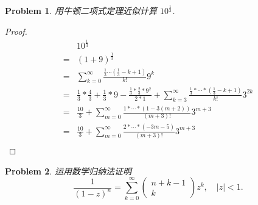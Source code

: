 \documentclass{ctexart}
\newtheorem{problem}{\textbf{Problem}}
\renewcommand{\(}{\left(}
\renewcommand{\)}{\right)}
\begin{document}
\begin{problem}
用牛顿二项式定理近似计算 $10^{\frac{1}{3}}$.
\end{problem}
\begin{proof}
\begin{equation}
    \begin{aligned}
        &10^{\frac{1}{3}}\\
    =&(1+9)^{\frac{1}{3}}\\
    =&\sum_{k=0}^{\infty}\frac{\frac{1}{3}\cdots(\frac{1}{3}-k+1)}{k!}9^k\\
    =&\frac{1}{3}*\frac{4}{3}+\frac{1}{3}*9-\frac{\frac{1}{3}*\frac{2}{3}*9^2}{2*1}+\sum_{k=3}^{\infty}\frac{\frac{1}{3}*\cdots *(\frac{1}{3}-k+1)}{k!}3^{2k}\\
    =&\frac{10}{3}+\sum_{m=0}^{\infty}\frac{1*\cdots *(1-3(m+2))}{(m+3)!}3^{m+3}\\
    =&\frac{10}{3}+\sum_{m=0}^{\infty}\frac{2*\cdots *(-3m-5)}{(m+3)!}3^{m+3}\\\iffalse    
    =&\frac{10}{3}+\sum_{t=0}^{\infty}\frac{1*\cdots *(1-3(2t+2))}{(2t+3)!}3^{2t+3}+\sum_{t=0}^{\infty}\frac{1*\cdots *(1-3(2t+3))}{(2t+4)!}3^{2t+4}\\
    =&\frac{10}{3}+\sum_{t=0}^{\infty}\(\frac{1*\cdots *(1-3(2t+2))}{(2t+3)!}3^{2t+3}+\frac{1*\cdots *(1-3(2t+3))}{(2t+4)!}3^{2t+4}\)\\
    =&\frac{10}{3}+\sum_{t=0}^{\infty}\(\frac{2*\cdots *(6t+5)}{(2t+3)!}3^{2t+3}-\frac{2*\cdots *(6t+8)}{(2t+4)!}3^{2t+4}\)\\
    =&\frac{10}{3}+\sum_{t=0}^{\infty}\frac{2*\cdots *(6t+5)}{(2t+3)!}\(1-\frac{6t+8}{2t+4}*3 \)3^{2t+3}\\
    =& \frac{10}{3}-\sum_{t=0}^{\infty}\frac{4*2*\cdots *(6t+5)*(4t+5)}{(2t+4)!}3^{2t+3}\\\fi
\end{aligned}
\end{equation}
\end{proof}
\begin{problem}
运用数学归纳法证明
$$
\frac{1}{(1-z)^n}=\sum_{k=0}^{\infty}\left(\begin{array}{c}
n+k-1 \\
k
\end{array}\right) z^k, \quad|z|<1 .$$
\end{problem}
\end{document}
